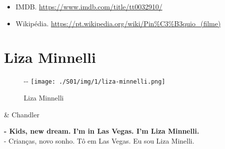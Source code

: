 \begin{itemize}
\tightlist
\item
  \sloppy IMDB. \url{https://www.imdb.com/title/tt0032910/}
\item
  \sloppy Wikipédia. \url{https://pt.wikipedia.org/wiki/Pin%C3%B3quio_(filme)}
\end{itemize}

\hypertarget{liza-minnelli}{%
\section{Liza Minnelli}\label{liza-minnelli}}

\begin{figure}[!ht]
  \begin{adjustwidth}{-\oddsidemargin-1in}{-\rightmargin}
    \centering
    \texttt{[image: ./S01/img/1/liza-minnelli.png]}
    \caption{Liza Minnelli\label{fig:liza-minnelli}}
  \end{adjustwidth}
\end{figure}

\begin{tcolorbox}[enhanced,center upper,
    drop fuzzy shadow southeast, boxrule=0.3pt,
    lower separated=false,
    colframe=black!30!dialogoBorder,colback=white]
\begin{minipage}[c]{0.14\linewidth}
   & \centering \scriptsize{Chandler}
\end{minipage}
\hspace{.1mm}
\begin{minipage}[c]{0.8\linewidth}
  \textbf{- Kids, new dream. I'm in Las Vegas. I'm Liza Minnelli.}\\
  - Crianças, novo sonho. Tô em Las Vegas. Eu sou Liza Minelli.
\end{minipage}
\end{tcolorbox}

